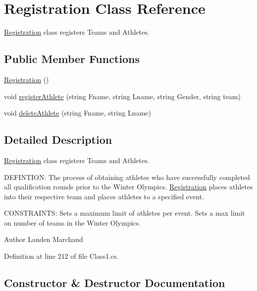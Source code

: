 \hypertarget{classRegistration}{}\section{Registration Class Reference}
\label{classRegistration}


\hyperlink{classRegistration}{Registration} class registers Teams and Athletes.  


\subsection*{Public Member Functions}
\begin{DoxyCompactItemize}
\item 
\hyperlink{classRegistration_a42b6fa0a52ec6f1a632c7dbae2e4995a}{Registration} ()
\item 
void \hyperlink{classRegistration_aa0b6171c6cfb18e6c67f003d776914de}{register\+Athlete} (string Fname, string Lname, string Gender, string team)
\item 
void \hyperlink{classRegistration_ab8effd4c7b67d1e767530a2534d8b354}{delete\+Athlete} (string Fname, string Lname)
\end{DoxyCompactItemize}


\subsection{Detailed Description}
\hyperlink{classRegistration}{Registration} class registers Teams and Athletes. 

D\+E\+F\+I\+N\+T\+I\+ON\+: The process of obtaining athletes who have successfully completed all qualification rounds prior to the Winter Olympics. \hyperlink{classRegistration}{Registration} places athletes into their respective team and places athletes to a specified event.

C\+O\+N\+S\+T\+R\+A\+I\+N\+TS\+: Sets a maximum limit of athletes per event. Sets a max limit on number of teams in the Winter Olympics.\begin{DoxyAuthor}{Author}
Landen Marchand 
\end{DoxyAuthor}


Definition at line 212 of file Class1.\+cs.



\subsection{Constructor \& Destructor Documentation}
\mbox{\label{classRegistration_a42b6fa0a52ec6f1a632c7dbae2e4995a}} 
